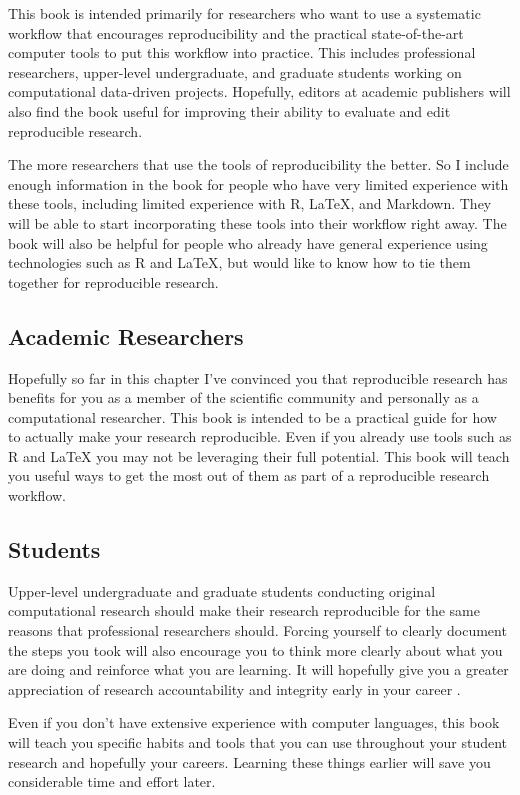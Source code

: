 \documentclass[krantz1]{krantz}
\begin{document}
This book is intended primarily for researchers who want to use a systematic workflow that encourages reproducibility and the practical state-of-the-art computer tools to put this workflow into practice. This includes professional researchers, upper-level undergraduate, and graduate students working on computational data-driven projects. Hopefully, editors at academic publishers will also find the book useful for improving their ability to evaluate and edit reproducible research. 

The more researchers that use the tools of reproducibility the better. So I include enough information in the book for people who have very limited experience with these tools, including limited experience with R, LaTeX, and Markdown. They will be able to start incorporating these tools into their workflow right away. The book will also be helpful for people who already have general experience using technologies such as R and LaTeX, but would like to know how to tie them together for reproducible research. 

\subsection{Academic Researchers}
Hopefully so far in this chapter I've convinced you that reproducible research has benefits for you as a member of the scientific community and personally as a computational researcher. This book is intended to be a practical guide for how to actually make your research reproducible. Even if you already use tools such as R and LaTeX you may not be leveraging their full potential. This book will teach you useful ways to get the most out of them as part of a reproducible research workflow.

\subsection{Students}
Upper-level undergraduate and graduate students conducting original computational research should make their research reproducible for the same reasons that professional researchers should. Forcing yourself to clearly document the steps you took will also encourage you to think more clearly about what you are doing and reinforce what you are learning. It will hopefully give you a greater appreciation of research accountability and integrity early in your career \cite[183]{Barr2012,Ball2012}.

Even if you don't have extensive experience with computer languages, this book will teach you specific habits and tools that you can use throughout your student research and hopefully your careers. Learning these things earlier will save you considerable time and effort later.
\end{document}
